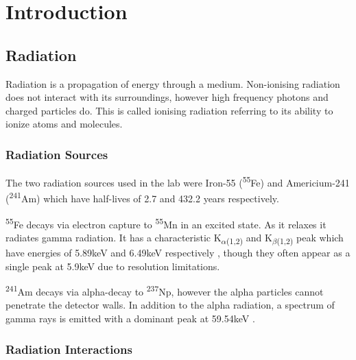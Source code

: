 \chapter{Introduction}

\section{Radiation}

Radiation is a propagation of energy through a medium. Non-ionising radiation does not interact with its surroundings, however high frequency photons and charged particles do. This is called ionising radiation referring to its ability to ionize atoms and molecules.

\subsection{Radiation Sources} \label{sec:intr:radiationSources}

The two radiation sources used in the lab were Iron-55 (\textsuperscript{55}Fe) and Americium-241 (\textsuperscript{241}Am) which have half-lives of 2.7 and 432.2 years respectively\cite{half_lives}.

\textsuperscript{55}Fe decays via electron capture to \textsuperscript{55}Mn in an excited state\cite{decay_modes}. As it relaxes it radiates gamma radiation. It has a characteristic K\textsubscript{$\alpha$(1,2)} and K\textsubscript{$\beta$(1,2)} peak which have energies of 5.89keV and 6.49keV respectively \cite{detailedDecayFe}, though they often appear as a single peak at 5.9keV due to resolution limitations.

\textsuperscript{241}Am decays via alpha-decay to \textsuperscript{237}Np\cite{decay_modes}, however the alpha particles cannot penetrate the detector walls. In addition to the alpha radiation, a spectrum of gamma rays is emitted with a dominant peak at 59.54keV \cite{detailedDecayAm}.

\subsection{Radiation Interactions}

